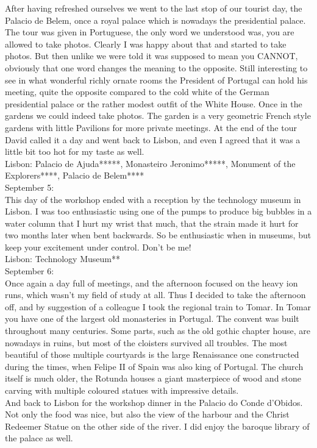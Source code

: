 After having refreshed ourselves we went to the last stop of our tourist day, the Palacio de Belem, once a royal palace which is nowadays the presidential palace. The tour was given in Portuguese, the only word we understood was, you are allowed to take photos. Clearly I was happy about that and started to take photos. But then unlike we were told it was supposed to mean you CANNOT, obviously that one word changes the meaning to the opposite. Still interesting to see in what wonderful richly ornate rooms the President of Portugal can hold his meeting, quite the opposite compared to the cold white of the German presidential palace or the rather modest outfit of the White House. Once in the gardens we could indeed take photos. The garden is a very geometric French style gardens with little Pavilions for more private meetings. At the end of the tour David called it a day and went back to Lisbon, and even I agreed that it was a little bit too hot for my taste as well.\\ 

Lisbon: Palacio de Ajuda*****, Monasteiro Jeronimo*****, Monument of the Explorers****, Palacio de Belem****\\

September 5:\\
This day of the workshop ended with a reception by the technology museum in Lisbon. I was too enthusiastic using one of the pumps to produce big bubbles in a water column that I hurt my wrist that much, that the strain made it hurt for two months later when bent backwards. So be enthusiastic when in museums, but keep your excitement under control. Don't be me!\\

Lisbon: Technology Museum**\\

September 6:\\
Once again a day full of meetings, and the afternoon focused on the heavy ion runs, which wasn't my field of study at all. Thus I decided to take the afternoon off, and by suggestion of a colleague I took the regional train to Tomar. In Tomar you have one of the largest old monasteries in Portugal. The convent was built throughout many centuries. Some parts, such as the old gothic chapter house, are nowadays in ruins, but most of the cloisters survived all troubles. The most beautiful of those multiple courtyards is the large Renaissance one constructed during the times, when Felipe II of Spain was also king of Portugal. The church itself is much older, the Rotunda houses a giant masterpiece of wood and stone carving with multiple coloured statues with impressive details. \\
And back to Lisbon for the workshop dinner in the Palacio do Conde d'Obidos. Not only the food was nice, but also the view of the harbour and the Christ Redeemer Statue on the other side of the river. I did enjoy the baroque library of the palace as well.\\

